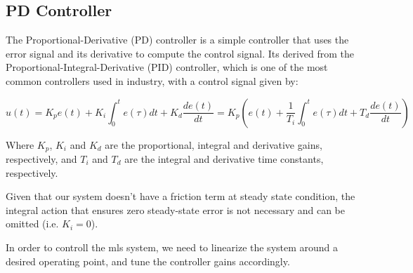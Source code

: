 \subsection{PD Controller}
\label{sec:pd}

The Proportional-Derivative (PD) controller is a simple controller that uses the error signal and its derivative to compute the control signal.
Its derived from the Proportional-Integral-Derivative (PID) controller, which is one of the most common controllers used in industry, with a control signal given by:

\begin{equation}
    u(t) = K_p e(t) + K_i \int_{0}^{t} e(\tau)dt + K_d \frac{de(t)}{dt} = K_p \left(e(t) + \frac{1}{T_i} \int_{0}^{t} e(\tau)dt + T_d \frac{de(t)}{dt}\right)
\end{equation}

Where $K_p$, $K_i$ and $K_d$ are the proportional, integral and derivative gains, respectively, and $T_i$ and $T_d$ are the integral and derivative time constants, respectively.

Given that our system doesn't have a friction term at steady state condition, the integral action that ensures zero steady-state error is not necessary and can be omitted (i.e. $K_i = 0$).

In order to controll the \acrshort{mls} system, we need to linearize the system around a desired operating point, and tune the controller gains accordingly.

